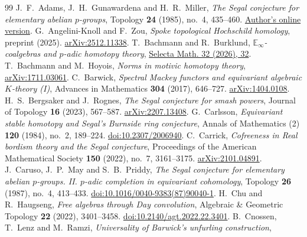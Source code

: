 \documentclass[11pt,a4paper]{article}
\theoremstyle{definition}
\begin{document}

\begin{thebibliography}{99}
\small
{} J.~F.~Adams, J.~H.~Gunawardena and H.~R.~Miller,
\emph{The Segal conjecture for elementary abelian $p$-groups},
Topology \textbf{24} (1985), no.~4, 435--460.
\href{https://math.mit.edu/~hrm/papers/adams-gunawardena-miller-segal-conjecture.pdf}{Author's online version}.
 G.~Angelini-Knoll and F.~Zou,
\emph{Spoke topological Hochschild homology}, preprint (2025).
\href{https://arxiv.org/abs/2512.11338}{arXiv:2512.11338}.
 T.~Bachmann and R.~Burklund,
\emph{$\mathbb{E}_\infty$-coalgebras and $p$-adic homotopy theory},
\href{https://doi.org/10.1007/s00029-026-01141-1}{Selecta Math. 32 (2026), 32}.
 T.~Bachmann and M.~Hoyois,
\emph{Norms in motivic homotopy theory},
\href{https://arxiv.org/abs/1711.03061}{arXiv:1711.03061}.
 C.~Barwick,
\emph{Spectral Mackey functors and equivariant algebraic $K$-theory (I)},
Advances in Mathematics \textbf{304} (2017), 646--727.
\href{https://arxiv.org/abs/1404.0108}{arXiv:1404.0108}.
 H.~S.~Bergsaker and J.~Rognes,
\emph{The Segal conjecture for smash powers},
Journal of Topology \textbf{16} (2023), 567--587.
\href{https://arxiv.org/abs/2207.13408}{arXiv:2207.13408}.
 G.~Carlsson,
\emph{Equivariant stable homotopy and Segal's Burnside ring conjecture},
Annals of Mathematics (2) \textbf{120} (1984), no.~2, 189--224.
\href{https://doi.org/10.2307/2006940}{doi:10.2307/2006940}.
 C.~Carrick,
\emph{Cofreeness in Real bordism theory and the Segal conjecture},
Proceedings of the American Mathematical Society \textbf{150} (2022), no.~7, 3161--3175.
\href{https://arxiv.org/abs/2101.04891}{arXiv:2101.04891}.
 J.~Caruso, J.~P.~May and S.~B.~Priddy,
\emph{The Segal conjecture for elementary abelian $p$-groups. II.
$p$-adic completion in equivariant cohomology},
Topology \textbf{26} (1987), no.~4, 413--433.
\href{https://doi.org/10.1016/0040-9383(87)90040-1}{doi:10.1016/0040-9383(87)90040-1}.
 H.~Chu and R.~Haugseng,
\emph{Free algebras through Day convolution},
Algebraic \& Geometric Topology \textbf{22} (2022), 3401--3458.
\href{https://doi.org/10.2140/agt.2022.22.3401}{doi:10.2140/agt.2022.22.3401}.
 B.~Cnossen, T.~Lenz and M.~Ramzi,
\emph{Universality of Barwick's unfurling construction},

\end{thebibliography}
\end{document}
